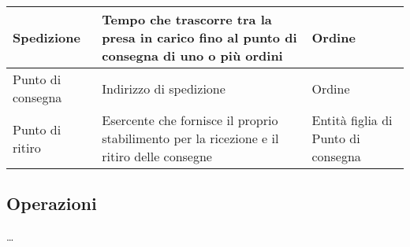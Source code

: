 \documentclass[11pt]{article}
\begin{document}
\begin{center}
\begin{tabularx}{0.98\textwidth} {
        | >{\raggedright\arraybackslash}X |
          >{\raggedright\arraybackslash}X |
          >{\raggedright\arraybackslash}X |
    }
        Spedizione &
        Tempo che trascorre tra la presa in carico fino al punto di consegna di uno o più ordini &
        Ordine \\ 
        \hline

        Punto di consegna &
        Indirizzo di spedizione &
        Ordine \\ 
        \hline

        Punto di ritiro &
        Esercente che fornisce il proprio stabilimento per la ricezione e il ritiro delle consegne &
        Entità figlia di Punto di consegna \\ 
        \hline
        

    \end{tabularx}
\end{center}

\subsection{Operazioni}

\dots
\end{document}
